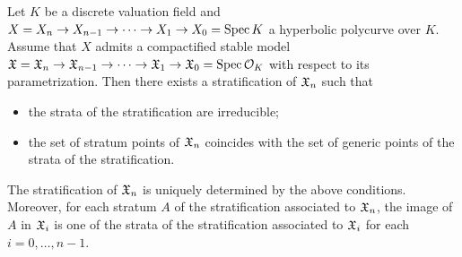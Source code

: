 \begin{lem}\label{StratificationOfStableCompactification}
  Let $K$ be a discrete valuation field and $X = X_n \to X_{n - 1} \to \cdots \to X_1 \to X_0 = \mathrm{Spec} \, K$ a hyperbolic polycurve over $K$. Assume that $X$ admits a compactified stable model $\mathfrak{X} = \mathfrak{X}_n \to \mathfrak{X}_{n - 1} \to \cdots \to \mathfrak{X}_1 \to \mathfrak{X}_0 = \mathrm{Spec} \, \mathcal{O}_K$ with respect to its parametrization. Then there exists a stratification of $\mathfrak{X}_n$ such that
  \begin{itemize}
    \item the strata of the stratification are irreducible;
    \item the set of stratum points of $\mathfrak{X}_n$ coincides with the set of generic points of the strata of the stratification.
  \end{itemize}
  The stratification of $\mathfrak{X}_n$ is uniquely determined by the above conditions. Moreover, for each stratum $A$ of the stratification associated to $\mathfrak{X}_n$, the image of $A$ in $\mathfrak{X}_i$ is one of the strata of the stratification associated to $\mathfrak{X}_i$ for each $i = 0, \ldots, n - 1$.
\end{lem}
